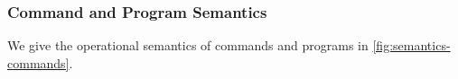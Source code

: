 
\subsubsection{Command and Program Semantics}
We give the operational semantics of commands and programs in
\cref{fig:semantics-commands}.  
%
